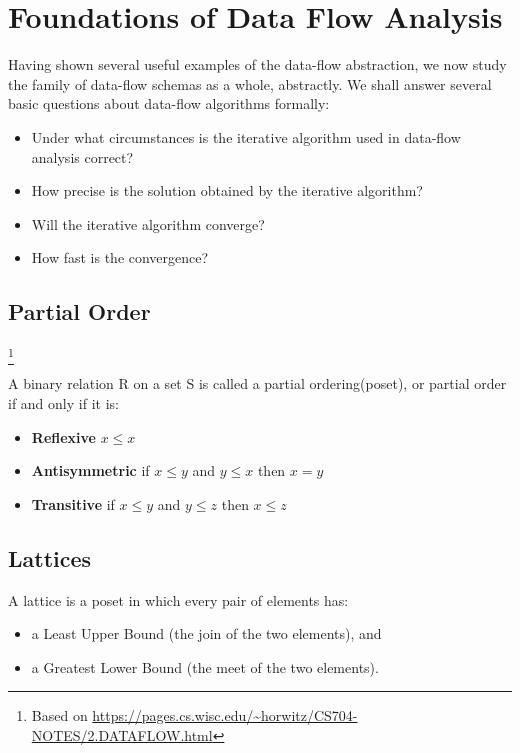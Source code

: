 \section{Foundations of Data Flow Analysis}



Having shown several useful examples of the data-flow abstraction, 
we now study the family of data-flow schemas as a whole, abstractly. 
We shall answer several basic questions about data-flow algorithms formally:

\begin{itemize}

\item Under what circumstances is the iterative algorithm used in data-flow analysis correct?
\item How precise is the solution obtained by the iterative algorithm?
\item Will the iterative algorithm converge?
\item How fast is the convergence?
\end{itemize}


\subsection{Partial Order}\footnote{Based on \url{https://pages.cs.wisc.edu/~horwitz/CS704-NOTES/2.DATAFLOW.html}}

A binary relation R on a set S is called a partial ordering(poset), or partial order if and only if it is:

\begin{itemize}
\item \textbf{Reflexive} \(x \leq x\)
\item \textbf{Antisymmetric} if \(x \leq y\) and \(y \leq x\) then \(x = y\)
\item \textbf{Transitive} if \(x \leq y\) and \(y \leq z\) then \(x \leq z\)
\end{itemize} 



\subsection{Lattices}

A lattice is a poset in which every pair of elements has:

\begin{itemize}
\item a Least Upper Bound (the join of the two elements), and
\item a Greatest Lower Bound (the meet of the two elements).
\end{itemize}    



